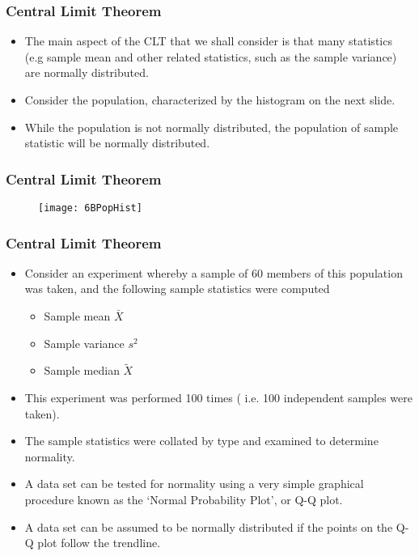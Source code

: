 \documentclass[a4]{beamer}
\begin{document}
\begin{frame}
\frametitle{Central Limit Theorem}
\begin{itemize}
\item The main aspect of the CLT that we shall consider is that many statistics (e.g sample mean and other related statistics, such as the sample variance) are normally distributed.
\item Consider the population, characterized by the histogram on the next slide.
\item While the population is not normally distributed, the population of sample statistic will be normally distributed.
\end{itemize}
\end{frame}
\begin{frame}
\frametitle{Central Limit Theorem}
\begin{figure}
  \texttt{[image: 6BPopHist]}\\

\end{figure}

\end{frame}
\begin{frame}
\frametitle{Central Limit Theorem}
\begin{itemize}
\item Consider an experiment whereby a sample of 60 members of this population was taken, and the following sample statistics were computed
    \begin{itemize}
    \item Sample mean $\bar{X}$
    \item Sample variance $s^2$
    \item Sample median $\tilde{X}$
    \end{itemize}
\item This experiment was performed 100 times ( i.e. 100 independent samples were taken).
\item The sample statistics were collated by type and examined to determine normality.
\item A data set can be tested for normality using a very simple graphical procedure known as the `Normal Probability Plot', or Q-Q plot.
\item A data set can be assumed to be normally distributed if the points on the Q-Q plot follow the trendline.
\end{itemize}
\end{frame}
\end{document}
